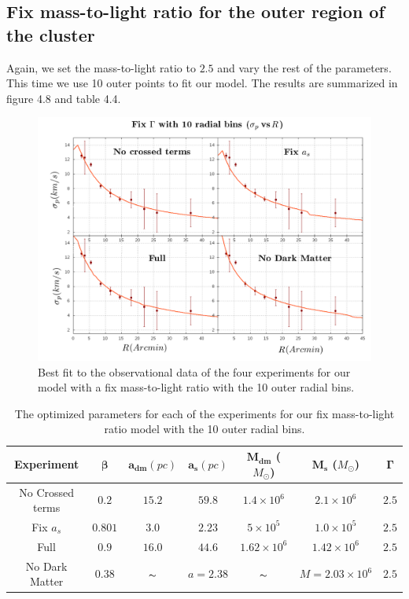
\subsection{Fix mass-to-light ratio for the outer region of the cluster}

Again, we set the mass-to-light ratio to $2.5$ and vary the rest of the parameters. This time we use 10 outer points to fit our model. The results are summarized in figure 4.8 and table 4.4.

\begin{figure}[H]
\centering
\includegraphics[width=15cm]{images/fix_gamma_refinado_10.png}
\caption[Best fit of our model with a fix mass-to-light ratio for the 10 radial bins]{Best fit to the observational data of the four experiments for our model with a fix mass-to-light ratio with the 10 outer radial bins.}
\end{figure}

\begin{table}[H]
\begin{center}
\begin{tabular}{| c| c| c| c| c| c| c|}
    \hline
    \textbf{Experiment} & $\mathbf{\beta}$ & $\mathbf{a_{dm}} (pc)$ & $\mathbf{a_{s}} (pc)$ & $\mathbf{M_{dm}}$ ($M_{\odot}$) & $\mathbf{M_{s}}$ ($M_{\odot}$) & $\mathbf{\Gamma}$\\ \hline
	No Crossed terms & $0.2$ &	$15.2$ &	$59.8$ &	$1.4 \times 10^{6}$ &	$2.1 \times 10^{6}$ &	$2.5$\\ \hline
	Fix $a_s$ &	$0.801$ &	$3.0$ &	$2.23$ &	$5 \times 10^{5}$ &	$1.0 \times 10 ^{5}$ &	$2.5$\\ \hline
	Full &	$0.9$ &	$16.0$ &	$44.6$ &	$1.62 \times 10^{6}$ &	$1.42 \times 10^{6}$ &	$2.5$\\ \hline
	No Dark Matter &	$0.38$ &	$\thicksim$ & $ a = 2.38$ &	$\thicksim$ & $  M = 2.03 \times 10^{6}$ & 	$2.5$\\
    \hline
  \end{tabular} 
\caption[Optimized parameters for our fix mass-to-light ratio model with the 10 outer radial bins.]{The optimized parameters for each of the experiments for our fix mass-to-light ratio model with the 10 outer radial bins.}
\end{center}
\end{table} 

